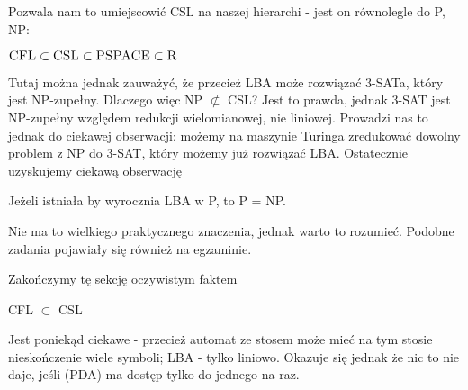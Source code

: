 Pozwala nam to umiejscowić CSL na naszej hierarchi - jest on równolegle do P, NP:

\begin{corollary}
    \( \textsc{CFL} \subset \textsc{CSL} \subset \textsc{PSPACE} \subset \textsc{R} \)
\end{corollary}

Tutaj można jednak zauważyć, że przecież LBA może rozwiązać 3-SATa, który jest NP-zupełny. Dlaczego więc NP \( \not \subset \) CSL? Jest to prawda,
jednak 3-SAT jest NP-zupełny względem redukcji wielomianowej, nie liniowej. Prowadzi nas to jednak do ciekawej obserwacji: możemy na maszynie Turinga
zredukować dowolny problem z NP do 3-SAT, który możemy już rozwiązać LBA. Ostatecznie uzyskujemy ciekawą obserwację

\begin{corollary}
    Jeżeli istniała by wyrocznia LBA w P, to P = NP.
\end{corollary}

Nie ma to wielkiego praktycznego znaczenia, jednak warto to rozumieć. Podobne zadania pojawiały się również na egzaminie.

Zakończymy tę sekcję oczywistym faktem

\begin{lemma}
    CFL \(\subset\) CSL
\end{lemma}

Jest poniekąd ciekawe - przecież automat ze stosem może mieć na tym stosie nieskończenie wiele symboli; LBA - tylko liniowo. Okazuje się jednak że
nic to nie daje, jeśli (PDA) ma dostęp tylko do jednego na raz.